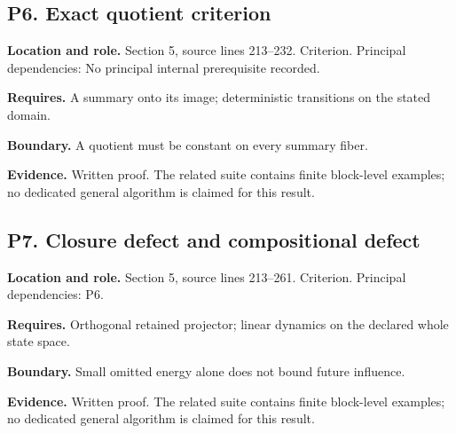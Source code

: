 \documentclass[11pt,letterpaper]{article}
\begin{document}
\par\noindent\begin{minipage}{\textwidth}
\subsection{P6. Exact quotient
criterion}\label{p6.-exact-quotient-criterion}

\textbf{Location and role.} Section 5, source lines 213--232. Criterion.
Principal dependencies: No principal internal prerequisite recorded.

\textbf{Requires.} A summary onto its image; deterministic transitions
on the stated domain.

\textbf{Boundary.} A quotient must be constant on every summary fiber.

\textbf{Evidence.} Written proof. The related suite contains finite
block-level examples; no dedicated general algorithm is claimed for this
result.
\end{minipage}\par\medskip

\par\noindent\begin{minipage}{\textwidth}
\subsection{P7. Closure defect and compositional
defect}\label{p7.-closure-defect-and-compositional-defect}

\textbf{Location and role.} Section 5, source lines 213--261. Criterion.
Principal dependencies: P6.

\textbf{Requires.} Orthogonal retained projector; linear dynamics on the
declared whole state space.

\textbf{Boundary.} Small omitted energy alone does not bound future
influence.

\textbf{Evidence.} Written proof. The related suite contains finite
block-level examples; no dedicated general algorithm is claimed for this
result.
\end{minipage}\par\medskip
\end{document}
